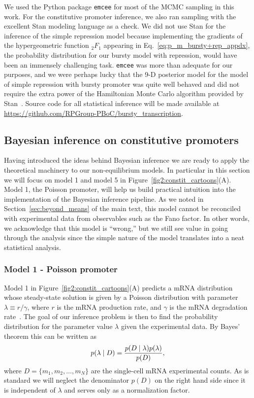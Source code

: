 We used the Python package \texttt{emcee} for most of the MCMC sampling
in this work. For the constitutive promoter inference, we also ran
sampling with the excellent Stan modeling language as a check. We did not
use Stan for the inference of the simple repression model because
implementing the gradients of the hypergeometric function ${_2F_1}$
appearing in Eq.~\ref{eq:p_m_bursty+rep_appdx}, the probability
distribution for our bursty model with repression, would have been
an immensely challenging task. \texttt{emcee} was more than adequate for
our purposes, and we were perhaps lucky that the 9-D posterior model
for the model of simple repression with bursty promoter was quite well
behaved and did not require the extra power of the Hamiltonian Monte
Carlo algorithm provided by Stan~\cite{Carpenter2017}.
Source code for all statistical inference will be made available at
\url{https://github.com/RPGroup-PBoC/bursty_transcription}.

\subsection{Bayesian inference on constitutive promoters}
\label{sec:si_bayes_unreg}

Having introduced the ideas behind Bayesian inference we are ready to apply the
theoretical machinery to our non-equilibrium models. In particular in this
section we will focus on model 1 and model 5 in
Figure~\ref{fig2:constit_cartoons}(A). Model 1, the Poisson promoter, will help
us build practical intuition into the implementation of the Bayesian inference
pipeline. As we noted in Section~\ref{sec:beyond_means} of the main text, this
model cannot be reconciled with experimental data from observables such as the
Fano factor. In other words, we acknowledge that this model is ``wrong,'' but we
still see value in going through the analysis since the simple nature of the
model translates into a neat statistical analysis.

\subsubsection{Model 1 - Poisson promoter}

Model 1 in Figure~\ref{fig2:constit_cartoons}(A) predicts a  mRNA distribution
whose steady-state solution is given by a Poisson distribution with parameter
$\lambda \equiv r / \gamma$, where $r$ is the mRNA production rate, and $\gamma$
is the mRNA degradation rate~\cite{Sanchez2013}. The goal of our inference
problem is then to find the probability distribution for the parameter value
$\lambda$ given the experimental data. By Bayes' theorem this can be written as
\begin{equation}
p(\lambda \mid D) = {p(D \mid \lambda) p(\lambda) \over p(D)},
\end{equation}
where $D = \{m_1, m_2, \ldots, m_N \}$ are the single-cell mRNA experimental
counts. As is standard we will neglect the denominator $p(D)$ on the right
hand side since it is independent of $\lambda$ and serves only as a
normalization factor.

